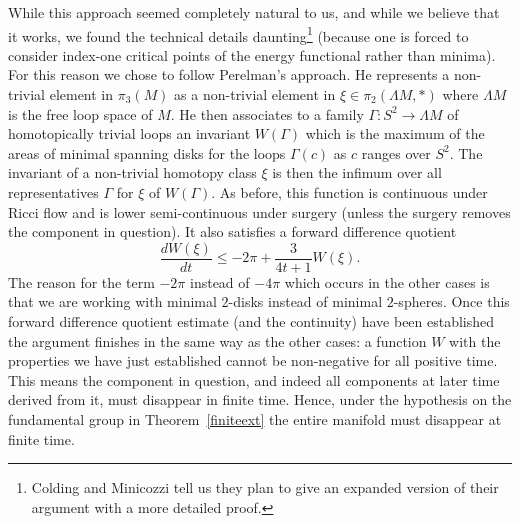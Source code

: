 While this approach seemed completely natural to us, and while we
believe that it works, we found the technical details
daunting\footnote{Colding and Minicozzi tell us they plan to give an
expanded version of their argument with a more detailed proof.}
(because one is forced to consider index-one critical points of the
energy functional rather than minima). For this reason we chose to
follow Perelman's approach. He represents a non-trivial element in
$\pi_3(M)$ as a non-trivial element in $\xi\in \pi_2(\Lambda M,*)$
where $\Lambda M$ is the free loop space of $M$. He then associates
to a family $\Gamma\colon S^2\to \Lambda M$ of homotopically trivial
loops an invariant $W(\Gamma)$ which is the maximum of the areas of
minimal spanning disks for the loops $\Gamma(c)$ as $c$ ranges over
$S^2$. The invariant of a non-trivial homotopy class $\xi$ is then
the infimum over all representatives $\Gamma$ for $\xi$ of
$W(\Gamma)$. As before, this function is continuous under Ricci flow
and is lower semi-continuous under surgery (unless the surgery
removes the component in question). It also satisfies a forward
difference quotient
$$\frac{dW(\xi)}{dt}\le -2\pi+\frac{3}{4t+1}W(\xi).$$
The reason for the term $-2\pi$ instead of $-4\pi$ which occurs in
the other cases is that we are working with minimal $2$-disks
instead of minimal $2$-spheres. Once this forward difference
quotient estimate (and the continuity) have been established the
argument finishes in the same way as the other cases: a function $W$
with the properties we have just established cannot be non-negative
for all positive time. This means the component in question, and
indeed all components at later time derived from it, must disappear
in finite time. Hence, under the hypothesis on the fundamental group
in Theorem~\ref{finiteext} the entire manifold must disappear at
finite time.

